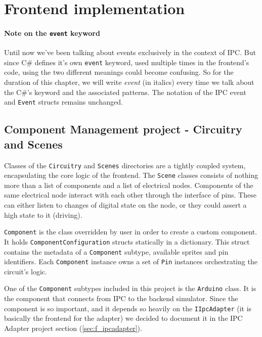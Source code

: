 \chapter{Frontend implementation} \label{ch:frontend}

\subsubsection{Note on the \texttt{event} keyword}

Until now we've been talking about events exclusively in the context of IPC. But since C\# defines it's own \texttt{event} keyword, used multiple times in the frontend's code, using the two different meanings could become confusing. So for the duration of this chapter, we will write \textit{event} (in italics) every time we talk about the C\#'s keyword and the associated patterns. The notation of the IPC event and \texttt{Event} structs remains unchanged.

\section{Component Management project - Circuitry and Scenes} \label{sec:cm_project_circuitry_and_scenes}

Classes of the \texttt{Circuitry} and \texttt{Scenes} directories are a tightly coupled system, encapsulating the core logic of the frontend. The \texttt{Scene} classes consists of nothing more than a list of components and a list of electrical nodes. Components of the same electrical node interact with each other through the interface of pins. These can either listen to changes of digital state on the node, or they could assert a high state to it (driving).

\texttt{Component} is the class overridden by user in order to create a custom component. It holds \texttt{ComponentConfiguration} structs statically in a dictionary. This struct contains the metadata of a \texttt{Component} subtype, available sprites and pin identifiers. Each \texttt{Component} instance owns a set of \texttt{Pin} instances orchestrating the circuit's logic. 

One of the \texttt{Component} subtypes included in this project is the \texttt{Arduino} class. It is the component that connects from IPC to the backend simulator. Since the component is so important, and it depends so heavily on the \texttt{IIpcAdapter} (it is basically the frontend for the adapter) we decided to document it in the IPC Adapter project section (\ref{sec:f_ipcadapter}). 

